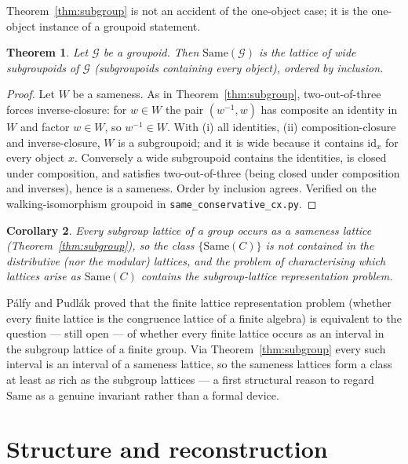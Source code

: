 \documentclass[11pt]{amsart}
\newtheorem{thm}{Theorem}[section]
\newtheorem{cor}[thm]{Corollary}
\theoremstyle{definition}
\newcommand{\Same}{\mathrm{Same}}
\begin{document}
Theorem~\ref{thm:subgroup} is not an accident of the one-object case; it is the
one-object instance of a groupoid statement.

\begin{thm}\label{thm:groupoid}
Let $\mathcal{G}$ be a groupoid. Then $\Same(\mathcal{G})$ is the lattice of
\emph{wide subgroupoids} of $\mathcal{G}$ (subgroupoids containing every object),
ordered by inclusion.
\end{thm}

\begin{proof}
Let $W$ be a sameness. As in Theorem~\ref{thm:subgroup}, two-out-of-three forces
inverse-closure: for $w\in W$ the pair $(w^{-1},w)$ has composite an identity in
$W$ and factor $w\in W$, so $w^{-1}\in W$. With (i) all identities, (ii)
composition-closure and inverse-closure, $W$ is a subgroupoid; and it is wide
because it contains $\mathrm{id}_x$ for every object $x$. Conversely a wide
subgroupoid contains the identities, is closed under composition, and satisfies
two-out-of-three (being closed under composition and inverses), hence is a
sameness. Order by inclusion agrees. Verified on the walking-isomorphism groupoid
in \texttt{same\_conservative\_cx.py}.
\end{proof}

\begin{cor}\label{cor:realize}
Every subgroup lattice of a group occurs as a sameness lattice
(Theorem~\ref{thm:subgroup}), so the class $\{\Same(C)\}$ is not contained in the
distributive (nor the modular) lattices, and the problem of characterising which
lattices arise as $\Same(C)$ contains the subgroup-lattice representation
problem.
\end{cor}

P\'alfy and Pudl\'ak \cite{PalfyPudlak} proved that the finite lattice
representation problem (whether every finite lattice is the congruence lattice of
a finite algebra) is equivalent to the question --- still open --- of whether
every finite lattice occurs as an interval in the subgroup lattice of a finite
group. Via Theorem~\ref{thm:subgroup} every such interval is an interval of a
sameness lattice, so the sameness lattices form a class at least as rich as the
subgroup lattices --- a first structural reason to regard $\Same$ as a genuine
invariant rather than a formal device.

\section{Structure and reconstruction}\label{sec:structure}
\end{document}
